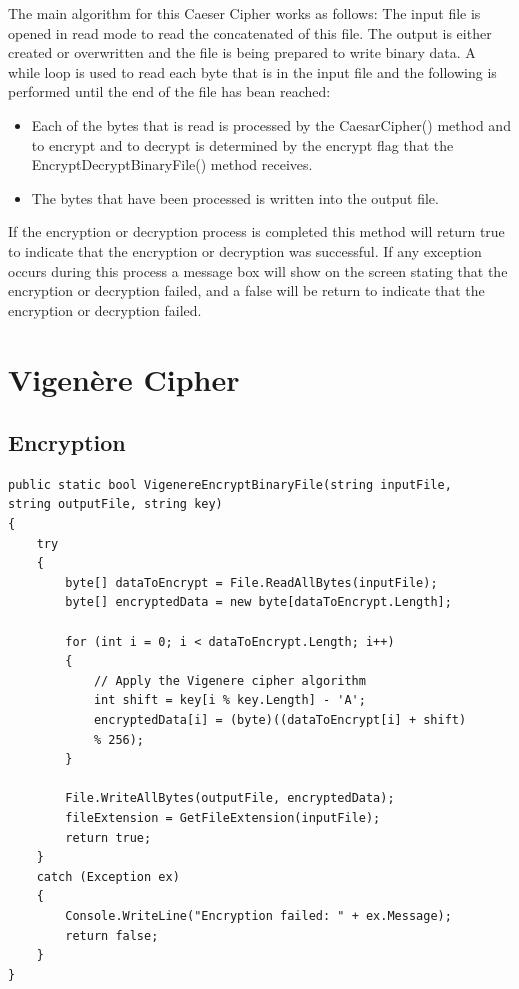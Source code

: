 \documentclass[a4paper,oneside,11pt]{book}
\begin{document}
The main algorithm for this Caeser Cipher works as follows:
The input file is opened in read mode to read the concatenated of this file. The output is either created or overwritten and the file is being prepared to write binary data. A while loop is used to read each byte that is in the input file and the following is performed until the end of the file has bean reached:
\begin{itemize}
    \item 
        Each of the bytes that is read is processed by the CaesarCipher() method and to encrypt and to decrypt is determined by the encrypt flag that the EncryptDecryptBinaryFile() method receives. 
    \item 
        The bytes that have been processed is written into the output file.
\end{itemize}
If the encryption or decryption process is completed this method will return true to indicate that the encryption or decryption was successful. If any exception occurs during this process a message box will show on the screen stating that the encryption or decryption failed, and a false will be return to indicate that the encryption or decryption failed.

\chapter[Vigenère Cipher]{Vigenère Cipher}
\section{Encryption}
\begin{lstlisting}[language=Csh, caption={Code for Vigenère Cipher Encryption}]
public static bool VigenereEncryptBinaryFile(string inputFile, 
string outputFile, string key)
{
    try
    {
        byte[] dataToEncrypt = File.ReadAllBytes(inputFile);
        byte[] encryptedData = new byte[dataToEncrypt.Length];

        for (int i = 0; i < dataToEncrypt.Length; i++)
        {
            // Apply the Vigenere cipher algorithm
            int shift = key[i % key.Length] - 'A'; 
            encryptedData[i] = (byte)((dataToEncrypt[i] + shift) 
            % 256);
        }

        File.WriteAllBytes(outputFile, encryptedData);
        fileExtension = GetFileExtension(inputFile);
        return true;
    }
    catch (Exception ex)
    {
        Console.WriteLine("Encryption failed: " + ex.Message);
        return false;
    }
}
\end{lstlisting}
\end{document}
